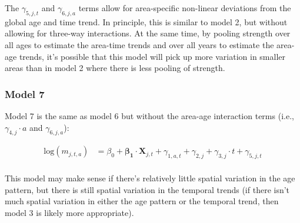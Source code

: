 \documentclass[12pt]{article}
\begin{document}
	The $\gamma_{5,j,t}$  and $\gamma_{6,j,a}$ terms allow for area-specific non-linear deviations from the global age and time trend. In principle, this is similar to model 2, but without allowing for three-way interactions. At the same time, by pooling strength over all ages to estimate the area-time trends and over all years to estimate the area-age trends, it's possible that this model will pick up more variation in smaller areas than in model 2 where there is less pooling of strength. 

\subsubsection{Model 7}
	Model 7 is the same as model 6 but without the area-age interaction terms (i.e., $\gamma_{4,j} \cdot a$ and $\gamma_{6,j,a}$): 

	\begin{align*}
		\text{log}(m_{j,t,a}) &= \beta_0 + \boldsymbol{\beta_1} \cdot \boldsymbol{X}_{j,t} + \gamma_{1,a,t} + \gamma_{2,j} + \gamma_{3,j} \cdot t + \gamma_{5,j,t} \\
	\end{align*}

	This model may make sense if there's relatively little spatial variation in the age pattern, but there is still spatial variation in the temporal trends (if there isn't much spatial variation in either the age pattern or the temporal trend, 
	then model 3 is likely more appropriate). 
\end{document}
